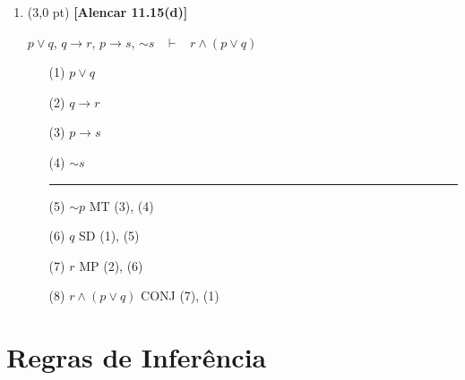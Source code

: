 \documentclass[12pt,a4paper,oneside]{article}
\begin{document}
\begin{enumerate}
\begin{enumerate}
		\item (3,0 pt) {\bf [Alencar 11.15(d)]} 
		\begin{center}
			$p \vee q$, $q \rightarrow r$, $p \rightarrow s$, $\sim s$ 
			\ $\vdash$ \ $r \wedge (p \vee q)$
		\end{center}
		{\color{blue}
			\begin{itemize}
				\item[(1)] $p \vee q$ 
				\item[(2)] $q \rightarrow r$
				\item[(3)] $p \rightarrow s$ 
				\item[(4)] $\sim s$ \\
				\rule{3cm}{0.5pt}
				\item[(5)] $\sim p$ \hspace*{1.6cm} MT (3), (4) 
				\item[(6)] $q$ \hspace*{2cm} SD (1), (5)
				\item[(7)] $r$ \hspace*{2cm} MP (2), (6)
				\item[(8)] $r \wedge (p \vee q)$ \hspace*{0.5cm} CONJ (7), (1)
			\end{itemize}
		}
		\vspace*{0.3cm}
		
	\end{enumerate}

\end{enumerate}

\newpage

\section*{Regras de Inferência}
\end{document}
